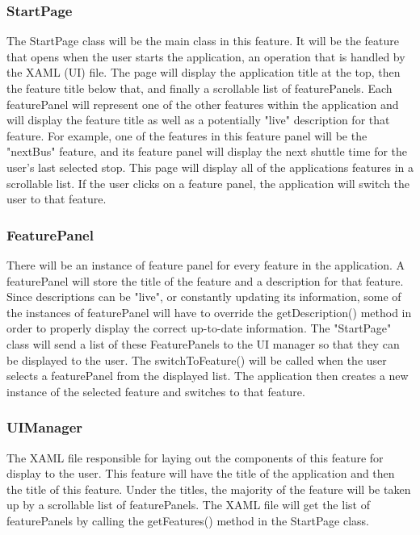 \documentclass[pdftex,12pt,letter]{article}
\begin{document}
\subsubsection{StartPage}
The StartPage class will be the main class in this feature. It will be the feature that opens when the user starts the application, an operation that is handled by the XAML (UI) file. The page will display the application title at the top, then the feature title below that, and finally a scrollable list of featurePanels. Each featurePanel will represent one of the other features within the application and will display the feature title as well as a potentially "live" description for that feature. For example, one of the features in this feature panel will be the "nextBus" feature, and its feature panel will display the next shuttle time for the user's last selected stop. This page will display all of the applications features in a scrollable list. If the user clicks on a feature panel, the application will switch the user to that feature.
\subsubsection{FeaturePanel}
There will be an instance of feature panel for every feature in the application. A featurePanel will store the title of the feature and a description for that feature. Since descriptions can be "live", or constantly updating its information, some of the instances of featurePanel will have to override the getDescription() method in order to properly display the correct up-to-date information. The "StartPage" class will send a list of these FeaturePanels to the UI manager so that they can be displayed to the user. The switchToFeature() will be called when the user selects a featurePanel from the displayed list. The application then creates a new instance of the selected feature and switches to that feature.
\subsubsection{UIManager}
The XAML file responsible for laying out the components of this feature for display to the user. This feature will have the title of the application and then the title of this feature. Under the titles, the majority of the feature will be taken up by a scrollable list of featurePanels. The XAML file will get the list of featurePanels by calling the getFeatures() method in the StartPage class. 
\end{document}
